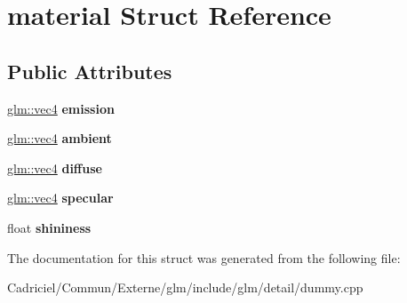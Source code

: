 \hypertarget{structmaterial}{}\section{material Struct Reference}
\label{structmaterial}
\subsection*{Public Attributes}
\begin{DoxyCompactItemize}
\item 
\hyperlink{group__core__types_ga5881b1b022d7fd1b7218f5916532dd02}{glm\+::vec4} {\bfseries emission}\hypertarget{structmaterial_a76b696726a2ea73e6840001821942bc3}{}\label{structmaterial_a76b696726a2ea73e6840001821942bc3}

\item 
\hyperlink{group__core__types_ga5881b1b022d7fd1b7218f5916532dd02}{glm\+::vec4} {\bfseries ambient}\hypertarget{structmaterial_a944296102e90b1610967530458f40ba1}{}\label{structmaterial_a944296102e90b1610967530458f40ba1}

\item 
\hyperlink{group__core__types_ga5881b1b022d7fd1b7218f5916532dd02}{glm\+::vec4} {\bfseries diffuse}\hypertarget{structmaterial_a506a0cc33282fa76872c6aeebd688b39}{}\label{structmaterial_a506a0cc33282fa76872c6aeebd688b39}

\item 
\hyperlink{group__core__types_ga5881b1b022d7fd1b7218f5916532dd02}{glm\+::vec4} {\bfseries specular}\hypertarget{structmaterial_a452d07b4570da7204caeaf798cd01a77}{}\label{structmaterial_a452d07b4570da7204caeaf798cd01a77}

\item 
float {\bfseries shininess}\hypertarget{structmaterial_aa3740fd7908ec5a11bbc4a4bd5b21abc}{}\label{structmaterial_aa3740fd7908ec5a11bbc4a4bd5b21abc}

\end{DoxyCompactItemize}


The documentation for this struct was generated from the following file\+:\begin{DoxyCompactItemize}
\item 
Cadriciel/\+Commun/\+Externe/glm/include/glm/detail/dummy.\+cpp\end{DoxyCompactItemize}
